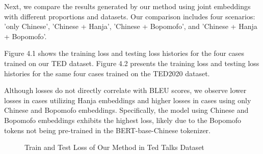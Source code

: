 \documentclass[PhD]{PHlab-thesis}
\begin{document}
Next, we compare the results generated by our method using joint embeddings with different proportions and datasets. Our comparison includes four scenarios: 'only Chinese', 'Chinese + Hanja', 'Chinese + Bopomofo', and 'Chinese + Hanja + Bopomofo'.

Figure 4.1 shows the training loss and testing loss histories for the four cases trained on our TED dataset. Figure 4.2 presents the training loss and testing loss histories for the same four cases trained on the TED2020 dataset.

Although losses do not directly correlate with BLEU scores, we observe lower losses in cases utilizing Hanja embeddings and higher losses in cases using only Chinese and Bopomofo embeddings. Specifically, the model using Chinese and Bopomofo embeddings exhibits the highest loss, likely due to the Bopomofo tokens not being pre-trained in the BERT-base-Chinese tokenizer.

\begin{figure}[h!]
  \centering
  \hfill
  \captionsetup{type=figure}
  \caption{Train and Test Loss of Our Method in Ted Talks Dataset}
  \label{fig:naver dictionary}
\end{figure}
\end{document}
